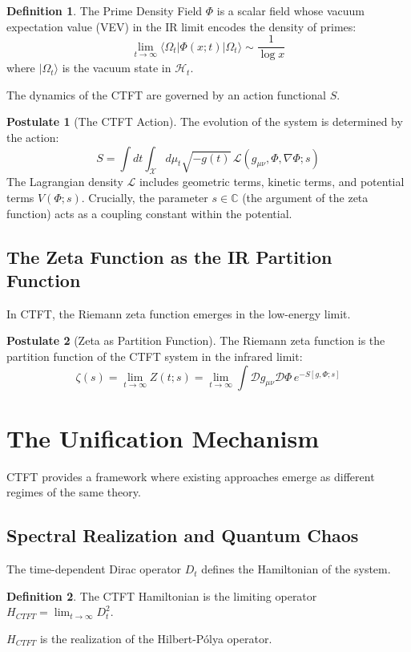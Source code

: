 \documentclass[11pt, a4paper]{article}
\theoremstyle{definition}
\newtheorem{definition}{Definition}[section]
\newtheorem{postulate}{Postulate}
\newcommand{\C}{\mathbb{C}}
\newcommand{\CTS}{\mathcal{X}}
\newcommand{\Lagr}{\mathcal{L}}
\newcommand{\Hilb}{\mathcal{H}}
\begin{document}
\begin{definition}
The Prime Density Field $\Phi$ is a scalar field whose vacuum expectation value (VEV) in the IR limit encodes the density of primes:
$$ \lim_{t\to\infty} \langle \Omega_t | \Phi(x; t) | \Omega_t \rangle \sim \frac{1}{\log x} $$
where $|\Omega_t\rangle$ is the vacuum state in $\Hilb_t$.
\end{definition}

The dynamics of the CTFT are governed by an action functional $S$.

\begin{postulate}[The CTFT Action]
The evolution of the system is determined by the action:
$$ S = \int dt \int_{\CTS} d\mu_t \sqrt{-g(t)} \, \Lagr(g_{\mu\nu}, \Phi, \nabla\Phi; s) $$
The Lagrangian density $\Lagr$ includes geometric terms, kinetic terms, and potential terms $V(\Phi; s)$. Crucially, the parameter $s \in \C$ (the argument of the zeta function) acts as a coupling constant within the potential.
\end{postulate}

\subsection{The Zeta Function as the IR Partition Function}
In CTFT, the Riemann zeta function emerges in the low-energy limit.

\begin{postulate}[Zeta as Partition Function]
The Riemann zeta function is the partition function of the CTFT system in the infrared limit:
$$ \zeta(s) = \lim_{t\to\infty} Z(t; s) = \lim_{t\to\infty} \int \mathcal{D}g_{\mu\nu} \mathcal{D}\Phi \, e^{-S[g, \Phi; s]} $$
\end{postulate}

\section{The Unification Mechanism}
CTFT provides a framework where existing approaches emerge as different regimes of the same theory.

\subsection{Spectral Realization and Quantum Chaos}
The time-dependent Dirac operator $D_t$ defines the Hamiltonian of the system.
\begin{definition}
The CTFT Hamiltonian is the limiting operator $H_{CTFT} = \lim_{t\to\infty} D_t^2$.
\end{definition}
$H_{CTFT}$ is the realization of the Hilbert-Pólya operator.
\end{document}
